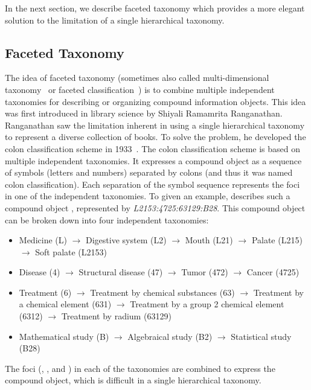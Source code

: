 In the next section, we describe faceted taxonomy which provides a more elegant solution to the limitation of a single hierarchical taxonomy.

\subsection{Faceted Taxonomy}
\label{sec:bg-ftaxonomy}
The idea of faceted taxonomy (sometimes also called multi-dimensional  taxonomy~\cite{sacco2009dynamic} or faceted classification~\cite{tunkelang2009faceted}) is to combine multiple independent taxonomies for describing or organizing compound information objects. This idea was first introduced in library science by Shiyali Ramamrita Ranganathan. Ranganathan saw the limitation inherent in using a single hierarchical taxonomy to represent a
diverse collection of books. To solve the problem, he developed the colon classification scheme in 1933~\cite{ranganathan1933colon}. The colon classification scheme is based on multiple independent taxonomies. It expresses a compound object as a sequence of symbols (letters and numbers) separated by colons (and thus it was named colon classification). Each separation of the symbol sequence represents the foci in one of the independent taxonomies. To given an example, \citet{ranganathan1950classification} describes such a compound object  , represented by \textit{L2153:4725:63129:B28}. This compound object can be broken down into four independent taxonomies:
\begin{itemize}
 \item Medicine (L) $\rightarrow$ Digestive system (L2) $\rightarrow$ Mouth (L21) $\rightarrow$ Palate (L215) $\rightarrow$ Soft palate (L2153)
\item Disease (4) $\rightarrow$ Structural disease (47) $\rightarrow$ Tumor (472) $\rightarrow$ Cancer (4725)
\item Treatment (6) $\rightarrow$ Treatment by chemical substances (63) $\rightarrow$ Treatment by a chemical element (631) $\rightarrow$ Treatment by a group 2 chemical element (6312) $\rightarrow$ Treatment by radium (63129)
\item Mathematical study (B) $\rightarrow$ Algebraical study (B2) $\rightarrow$ Statistical study (B28)
\end{itemize}
The foci (, ,  and ) in each of the taxonomies are combined to express the compound object, which is difficult in a single hierarchical taxonomy.

